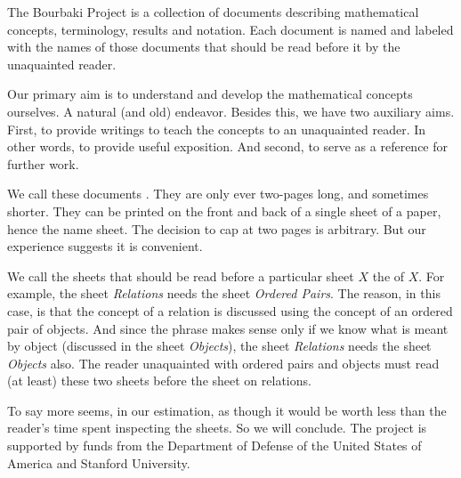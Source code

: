 
The Bourbaki Project is a collection
of documents describing mathematical
concepts, terminology, results and
notation. Each document is named and
labeled with the names of those documents
that should be read before it by the
unaquainted reader.

Our primary aim is to understand and
develop the mathematical concepts ourselves.
A natural (and old) endeavor.
Besides this, we have two auxiliary aims.
First, to provide writings to teach
the concepts to an unaquainted reader. In other
words, to provide useful exposition.
And second, to serve as a reference for
further work.

We call these documents .
They are only ever two-pages long, and
sometimes shorter.
They can be printed on the front
and back of a single
sheet of a paper, hence the name sheet.
The decision to cap at two pages is
arbitrary.
But our
experience suggests it is convenient.

We call the sheets that should
be read before a particular sheet
$X$ the  of $X$.
For example, the sheet \textit{Relations}
needs the sheet \textit{Ordered Pairs}.
The reason, in this case, is that the
concept of a relation is discussed using
the concept of an ordered pair of objects.
And since the phrase
 makes sense
only if we know what is meant by object
(discussed in the sheet \textit{Objects}),
the sheet \textit{Relations} needs the sheet
\textit{Objects} also.
The reader unaquainted with
ordered pairs and
objects must read (at least) these two
sheets before the sheet on relations.



%
%


To say more seems, in our
estimation, as though it would be
worth less than the reader's
time spent inspecting the sheets.
So we will conclude.
The project is supported by
funds from the Department of
Defense of the United States of America
and Stanford University.
